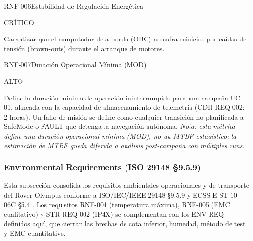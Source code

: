 \begin{reqblock}{RNF-006}{Estabilidad de Regulación Energética}
    \item[\textbf{Prioridad:}] CRÍTICO
    \item[\textbf{Racional:}] Garantizar que el computador de a bordo (OBC) no sufra reinicios por caídas de tensión (brown-outs) durante el arranque de motores.
\end{reqblock}

\begin{reqblock}{RNF-007}{Duración Operacional Mínima (MOD)}
    \item[\textbf{Prioridad:}] ALTO
    \item[\textbf{Racional:}] Define la duración mínima de operación ininterrumpida para una campaña UC-01, alineada con la capacidad de almacenamiento de telemetría (CDH-REQ-002: 2 horas). Un fallo de misión se define como cualquier transición no planificada a SafeMode o FAULT que detenga la navegación autónoma. \textit{Nota: esta métrica define una duración operacional mínima (MOD), no un MTBF estadístico; la estimación de MTBF queda diferida a análisis post-campaña con múltiples runs.}
\end{reqblock}

\subsubsection{Environmental Requirements (ISO 29148 §9.5.9)}\label{subsubsec:env_req}

Esta subsección consolida los requisitos ambientales operacionales y de transporte del Rover Olympus conforme a ISO/IEC/IEEE 29148 §9.5.9 \cite{ieee_29148} y ECSS-E-ST-10-06C §5.4 \cite{ecss_e_st_10_06c}. Los requisitos RNF-004 (temperatura máxima), RNF-005 (EMC cualitativo) y STR-REQ-002 (IP4X) se complementan con los ENV-REQ definidos aquí, que cierran las brechas de cota inferior, humedad, método de test y EMC cuantitativo.

